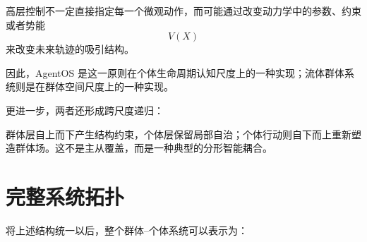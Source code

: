 高层控制不一定直接指定每一个微观动作，而可能通过改变动力学中的参数、约束或者势能
\[
V(X)
\]
来改变未来轨迹的吸引结构。

因此，AgentOS 是这一原则在个体生命周期认知尺度上的一种实现；流体群体系统则是在群体空间尺度上的一种实现。

更进一步，两者还形成跨尺度递归：
\begin{statementbox}
\centering
{}
\end{statementbox}

群体层自上而下产生结构约束，个体层保留局部自治；个体行动则自下而上重新塑造群体场。这不是主从覆盖，而是一种典型的分形智能耦合。


\section{完整系统拓扑}

将上述结构统一以后，整个群体--个体系统可以表示为：


